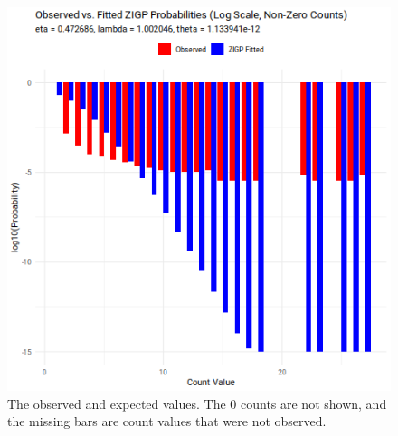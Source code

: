 \documentclass[authoryear,preprint,12pt,3p]{elsarticle}
\begin{document}
\begin{figure}[thbp]
  \begin{center}
    \centering
    \includegraphics[totalheight=8cm]{./figs/plot_zigp_comparison_fixed.png}
    \caption{The observed and expected values. The 0 counts are not shown, and the missing bars are count values that
      were not observed.}
    \label{figure:plot_zigp_comparison_fixed.png} 
  \end{center}
\end{figure}





\end{document}
